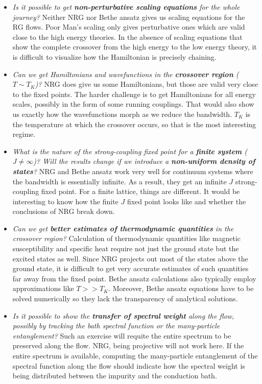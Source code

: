 \documentclass[14pt]{extarticle}
\numberwithin{equation}{section}
\begin{document}
\begin{itemize}
	\item \textit{Is it possible to get \textbf{non-perturbative scaling equations} for the whole journey?}
	Neither NRG nor Bethe ansatz gives us scaling equations for the RG flows. Poor Man's scaling only gives perturbative ones which are valid close to the high energy theories. In the absence of scaling equations that show the complete crossover from the high energy to the low energy theory, it is difficult to visualize how the Hamiltonian is precisely chaining.
	\item \textit{Can we get Hamiltonians and wavefunctions in the \textbf{crossover region} (\(T \sim T_K\))?}
		NRG does give us some Hamiltonians, but those are valid very close to the fixed points. The harder challenge is to get Hamiltonians for all energy scales, possibly in the form of some running couplings. That would also show us exactly how the wavefunctions morph as we reduce the bandwidth. \(T_K\) is the temperature at which the crossover occurs, so that is the most interesting regime.
	\item \textit{What is the nature of the strong-coupling fixed point for a \textbf{finite system} (\(J \neq \infty\))? Will the results change if we introduce a \textbf{non-uniform density of states}?}
		NRG and Bethe ansatz work very well for continuum systems where the bandwidth is essentially infinite. As a result, they get an infinite \(J\) strong-coupling fixed point. For a finite lattice, things are different. It would be interesting to know how the finite \(J\) fixed point looks like and whether the conclusions of NRG break down.
	\item \textit{Can we get \textbf{better estimates of thermodynamic quantities} in the crossover region?}
		Calculation of thermodynamic quantities like magnetic susceptibility and specific heat require not just the ground state but the excited states as well. Since NRG projects out most of the states above the ground state, it is difficult to get very accurate estimates of such quantities far away from the fixed point. Bethe ansatz calculations also typically  employ approximations like \(T>>T_K\). Moreover, Bethe ansatz equations have to be solved numerically so they lack the transparency of analytical solutions.
	\item \textit{Is it possible to show the \textbf{transfer of spectral weight} along the flow, possibly by tracking the bath spectral function or the many-particle entanglement?}
	Such an exercise will requite the entire spectrum to be preserved along the flow. NRG, being projective will not work here. If the entire spectrum is available, computing the many-particle entanglement of the spectral function along the flow should indicate how the spectral weight is being distributed between the impurity and the conduction bath.

\end{itemize}
\end{document}
